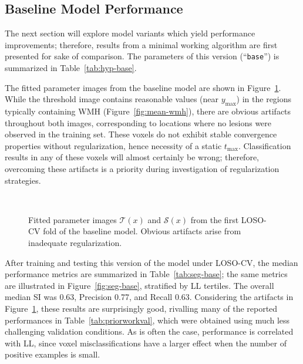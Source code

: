 \subsection{Baseline Model Performance}\label{ss:exp-base}
The next section will explore model variants which yield performance improvements;
therefore, results from a minimal working algorithm are first presented for sake of comparison.
The parameters of this version (``\texttt{base}'') is summarized in Table~\ref{tab:hyp-base}.
\par
The fitted parameter images from the baseline model
are shown in Figure~\ref{fig:beta-base}.
While the threshold image contains reasonable values (near $y_{\max}$)
in the regions typically containing WMH (Figure~\ref{fig:mean-wmh}),
there are obvious artifacts throughout both images,
corresponding to locations where no lesions were observed in the training set.
These voxels do not exhibit stable convergence properties without regularization,
hence necessity of a static $t_{\max}$.
Classification results in any of these voxels will almost certainly be wrong;
therefore, overcoming these artifacts is a priority
during investigation of regularization strategies.
\par
\begin{figure}
  \centering
  \\[0.5em]
  \caption{Fitted parameter images $\mathcal{T}(x)$ and $\mathcal{S}(x)$
    from the first LOSO-CV fold of the baseline model.
    Obvious artifacts arise from inadequate regularization.}%
  \label{fig:beta-base}
\end{figure}
After training and testing this version of the model under LOSO-CV,
the median performance metrics are summarized in Table~\ref{tab:seg-base};
the same metrics are illustrated in Figure~\ref{fig:seg-base}, stratified by LL tertiles.
The overall median SI was 0.63, Precision 0.77, and Recall 0.63.
Considering the artifacts in Figure~\ref{fig:beta-base},
these results are surprisingly good,
rivalling many of the reported performances in Table~\ref{tab:priorworkval},
which were obtained using much less challenging validation conditions.
As is often the case, performance is correlated with LL,
since voxel misclassifications have a larger effect
when the number of positive examples is small.
